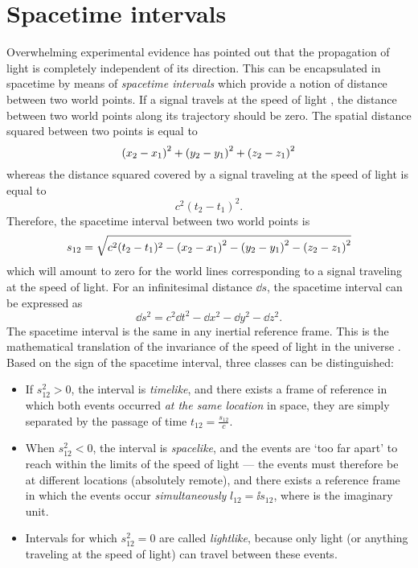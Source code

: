 \section{Spacetime intervals}
Overwhelming experimental evidence has pointed out that the propagation of light is completely independent of its direction. This can be encapsulated in spacetime by means of \emph{spacetime intervals} which provide a notion of distance between two world points. If a signal travels at the speed of light , the distance between two world points along its trajectory should be zero. The spatial distance squared between two points is equal to
\[ \qty(x_2 - x_1)^2 + \qty(y_2 - y_1)^2 + \qty(z_2 - z_1)^2 \]
whereas the distance squared covered by a signal traveling at the speed of light is equal to 
\[c^2(t_2 - t_1)^2. \]
Therefore, the spacetime interval  between two world points is
\[
    s_{12} = \sqrt{c^2(t_2 - t_1)^2 - \qty(x_2 - x_1)^2 - \qty(y_2 - y_1)^2 - \qty(z_2 - z_1)^2}
\]
which will amount to zero for the world lines corresponding to a signal traveling at the speed of light. For an infinitesimal distance \(\dd{s}\), the spacetime interval can be expressed as
\[ \dd{s}^2 = c^2 \dd{t}^2 - \dd{x}^2 - \dd{y}^2 - \dd{z}^2.\]
The spacetime interval is the same in any inertial reference frame. This is the mathematical translation of the invariance of the speed of light in the universe \cite{Landau1971}. Based on the sign of the spacetime interval, three classes can be distinguished:
\begin{itemize}
    \item If \(s_{12}^2 > 0\), the interval is \emph{timelike}, and there exists a frame of reference in which both events occurred \emph{at the same location} in space, they are simply separated by the passage of time \(\displaystyle t_{12} = \frac{s_{12}}{c}\). 
    \item When \(s_{12}^2 < 0\), the interval is \emph{spacelike}, and the events are `too far apart' to reach within the limits of the speed of light --- the events must therefore be at different locations (absolutely remote), and there exists a reference frame in which the events occur \emph{simultaneously} \(l_{12} = \ii s_{12}\), where  is the imaginary unit.
    \item Intervals for which \(s_{12}^2 = 0\) are called \emph{lightlike}, because only light (or anything traveling at the speed of light) can travel between these events.
\end{itemize}
